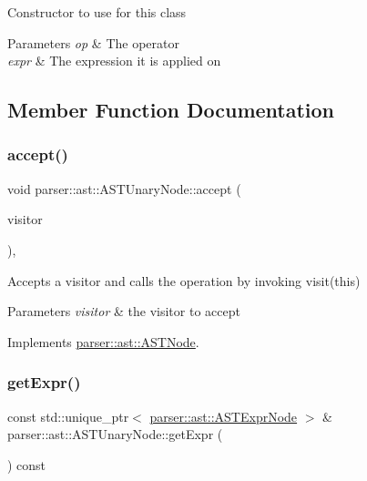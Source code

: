 Constructor to use for this class 
\begin{DoxyParams}{Parameters}
{\em op} & The operator \\
\hline
{\em expr} & The expression it is applied on \\
\hline
\end{DoxyParams}


\subsection{Member Function Documentation}
\mbox{\label{classparser_1_1ast_1_1ASTUnaryNode_a4b3bd9c26548e1fb73a82fd5b20add0b}} 
\subsubsection{\texorpdfstring{accept()}{accept()}}
{\footnotesize\ttfamily void parser\+::ast\+::\+A\+S\+T\+Unary\+Node\+::accept (\begin{DoxyParamCaption}\item[{\hyperlink{classvisitor_1_1Visitor}{visitor\+::\+Visitor} $\ast$}]{visitor }\end{DoxyParamCaption})\hspace{0.3cm}{\ttfamily [override]}, {\ttfamily [virtual]}}

Accepts a visitor and calls the operation by invoking {\ttfamily visit(this)} 
\begin{DoxyParams}{Parameters}
{\em visitor} & the visitor to accept \\
\hline
\end{DoxyParams}


Implements \hyperlink{classparser_1_1ast_1_1ASTNode_a3ff84fdfdbbc5c39b70b4d04c22e7dc3}{parser\+::ast\+::\+A\+S\+T\+Node}.

\mbox{\label{classparser_1_1ast_1_1ASTUnaryNode_a144541a1fef1be081ad57bfc0ce0039f}} 
\subsubsection{\texorpdfstring{get\+Expr()}{getExpr()}}
{\footnotesize\ttfamily const std\+::unique\+\_\+ptr$<$ \hyperlink{classparser_1_1ast_1_1ASTExprNode}{parser\+::ast\+::\+A\+S\+T\+Expr\+Node} $>$ \& parser\+::ast\+::\+A\+S\+T\+Unary\+Node\+::get\+Expr (\begin{DoxyParamCaption}{ }\end{DoxyParamCaption}) const}


